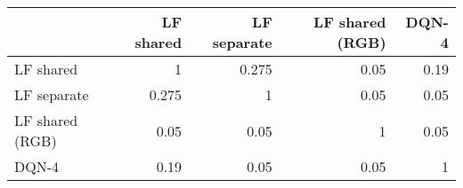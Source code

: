 \begin{tabular}{lrrrr}
\hline
                 &   LF shared &   LF separate &   LF shared (RGB) &   DQN-4 \\
\hline
 LF shared       &       1     &         0.275 &              0.05 &    0.19 \\
 LF separate     &       0.275 &         1     &              0.05 &    0.05 \\
 LF shared (RGB) &       0.05  &         0.05  &              1    &    0.05 \\
 DQN-4           &       0.19  &         0.05  &              0.05 &    1    \\
\hline
\end{tabular}